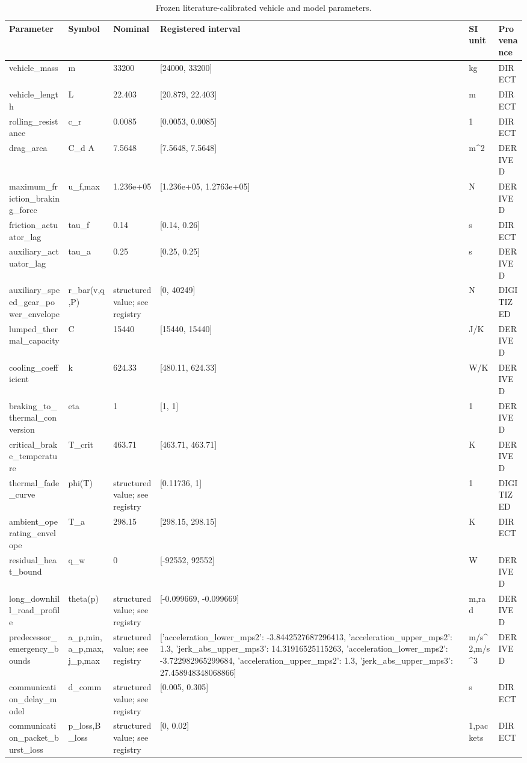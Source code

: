 \begin{table}[!t]
\centering
\scriptsize
\caption{Frozen literature-calibrated vehicle and model parameters.}
\label{tab:phase2m-parameters}
\begin{tabular}{llllll}
\hline
Parameter & Symbol & Nominal & Registered interval & SI unit & Provenance \\
\hline
vehicle\_mass & m & 33200 & [24000, 33200] & kg & DIRECT \\
vehicle\_length & L & 22.403 & [20.879, 22.403] & m & DIRECT \\
rolling\_resistance & c\_r & 0.0085 & [0.0053, 0.0085] & 1 & DIRECT \\
drag\_area & C\_d A & 7.5648 & [7.5648, 7.5648] & m^2 & DERIVED \\
maximum\_friction\_braking\_force & u\_f,max & 1.236e+05 & [1.236e+05, 1.2763e+05] & N & DERIVED \\
friction\_actuator\_lag & tau\_f & 0.14 & [0.14, 0.26] & s & DIRECT \\
auxiliary\_actuator\_lag & tau\_a & 0.25 & [0.25, 0.25] & s & DERIVED \\
auxiliary\_speed\_gear\_power\_envelope & r\_bar(v,q,P) & structured value; see registry & [0, 40249] & N & DIGITIZED \\
lumped\_thermal\_capacity & C & 15440 & [15440, 15440] & J/K & DERIVED \\
cooling\_coefficient & k & 624.33 & [480.11, 624.33] & W/K & DERIVED \\
braking\_to\_thermal\_conversion & eta & 1 & [1, 1] & 1 & DERIVED \\
critical\_brake\_temperature & T\_crit & 463.71 & [463.71, 463.71] & K & DERIVED \\
thermal\_fade\_curve & phi(T) & structured value; see registry & [0.11736, 1] & 1 & DIGITIZED \\
ambient\_operating\_envelope & T\_a & 298.15 & [298.15, 298.15] & K & DIRECT \\
residual\_heat\_bound & q\_w & 0 & [-92552, 92552] & W & DERIVED \\
long\_downhill\_road\_profile & theta(p) & structured value; see registry & [-0.099669, -0.099669] & m,rad & DERIVED \\
predecessor\_emergency\_bounds & a\_p,min,a\_p,max,j\_p,max & structured value; see registry & [{'acceleration\_lower\_mps2': -3.8442527687296413, 'acceleration\_upper\_mps2': 1.3, 'jerk\_abs\_upper\_mps3': 14.31916525115263}, {'acceleration\_lower\_mps2': -3.722982965299684, 'acceleration\_upper\_mps2': 1.3, 'jerk\_abs\_upper\_mps3': 27.458948348068866}] & m/s^2,m/s^3 & DERIVED \\
communication\_delay\_model & d\_comm & structured value; see registry & [0.005, 0.305] & s & DIRECT \\
communication\_packet\_burst\_loss & p\_loss,B\_loss & structured value; see registry & [0, 0.02] & 1,packets & DIRECT \\
\hline
\end{tabular}
\end{table}
